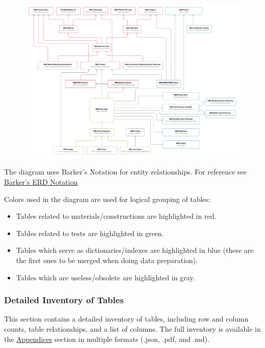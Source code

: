 \begin{figure}[h!]
\centering
\includegraphics[width=\textwidth]{PDFs/er_diagram.pdf}
\end{figure}

The diagram uses Barker's Notation for entity relationships. For reference see \href{https://ece.uprm.edu/~icom5047/documents/barkers-erd-notation.pdf}{Barker's ERD Notation}

Colors used in the diagram are used for logical grouping of tables:
\begin{itemize}
    \item Tables related to \textcolor[HTML]{cc3e44}{materials/constructions} are highlighted in \textcolor[HTML]{cc3e44}{red}.
    \item Tables related to \textcolor[HTML]{8dc149}{tests} are highlighted in \textcolor[HTML]{8dc149}{green}.
    \item Tables which serve as \textcolor[HTML]{519aba}{dictionaries/indexes} are highlighted in \textcolor[HTML]{519aba}{blue} (these are the first ones to be merged when doing data preparation).
    \item Tables which are \textcolor[HTML]{808080}{useless/obsolete} are highlighted in \textcolor[HTML]{808080}{gray}.
\end{itemize}



\subsubsection{Detailed Inventory of Tables}

This section contains a detailed inventory of tables, including row and column counts, table relationships, and a list of columns. The full inventory is available in the \hyperref[sec:Appendices]{Appendices} section in multiple formats (.json, .pdf, and .md).

